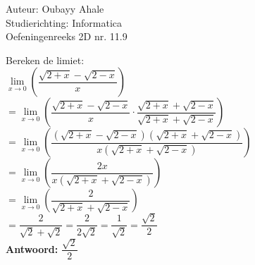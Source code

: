 \documentclass[a4paper]{article}
\newcommand{\llim}{\lim\limits}
\begin{document}
  
\noindent \large Auteur: Oubayy Ahale         \\
\noindent \large Studierichting: Informatica  \\
\noindent \large Oefeningenreeks 2D nr. 11.9  \\

\medskip

\normalsize

Bereken de limiet:\\

$\llim_{x \rightarrow 0} \left( \dfrac{\sqrt{2 + x} - \sqrt{2 - x}}{x} \right) $\\

$ = \llim_{x \rightarrow 0} \left( \dfrac{\sqrt{2 + x} - \sqrt{2 - x}}{x} \cdot \dfrac{\sqrt{2 + x} + \sqrt{2 - x}}{\sqrt{2 + x} + \sqrt{2 - x}} \right) $\\

$ = \llim_{x \rightarrow 0} \left( \dfrac{(\sqrt{2 + x} - \sqrt{2 - x})(\sqrt{2 + x} + \sqrt{2 - x})}{x(\sqrt{2 + x} + \sqrt{2 - x})} \right) $\\

$ = \llim_{x \rightarrow 0} \left( \dfrac{2x}{x(\sqrt{2 + x} + \sqrt{2 - x})} \right) $\\

$ = \llim_{x \rightarrow 0} \left( \dfrac{2}{\sqrt{2 + x} + \sqrt{2 - x}} \right) $\\

$ = \dfrac{2}{\sqrt{2} + \sqrt{2}} = \dfrac{2}{2\sqrt{2}} = \dfrac{1}{\sqrt{2}} = \dfrac{\sqrt{2}}{2} $\\

\textbf{Antwoord: } $\boxed{\dfrac{\sqrt{2}}{2}}$\\
\end{document}
